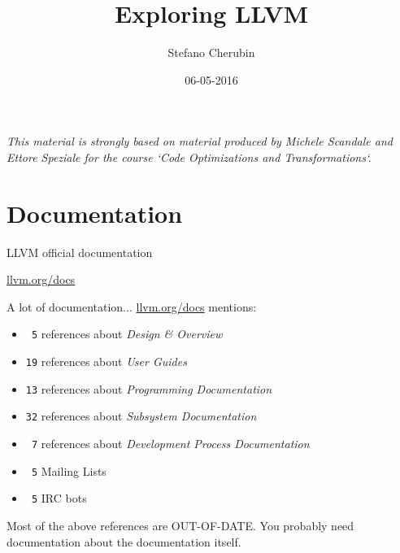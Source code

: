 \documentclass[10pt,mathserif]{beamer}
\author{Stefano Cherubin}
\institute{Politecnico di Milano}
\date{06-05-2016}
\title{Exploring LLVM}
\begin{document}
\begin{frame}
\maketitle
\begin{center}
\itshape\scriptsize This material is strongly based on material produced by
                    Michele Scandale and Ettore Speziale for the course
                    `Code Optimizations and Transformations`.
\end{center}
\end{frame}

\section{Documentation}
\begin{frame}[t]{LLVM official documentation}
  \begin{center}
    \begin{Huge}
      \vfill
      \url{llvm.org/docs}
      \vfill
    \end{Huge}
  \end{center}
\end{frame}

\begin{frame}[t]{A lot of documentation...}
  \url{llvm.org/docs} mentions:
  \begin{itemize}
    \item \texttt{\ 5} references about \textit{Design \& Overview}
    \item \texttt{19} references about \textit{User Guides}
    \item \texttt{13} references about \textit{Programming Documentation}
    \item \texttt{32} references about \textit{Subsystem Documentation}
    \item \texttt{\ 7} references about \textit{Development Process Documentation}
    \item \texttt{\ 5} Mailing Lists
    \item \texttt{\ 5} IRC bots
  \end{itemize}
  \vfill
  Most of the above references are OUT-OF-DATE.
  \vfill
  You probably need documentation about the documentation itself.
  \vfill
\end{frame}
\end{document}
